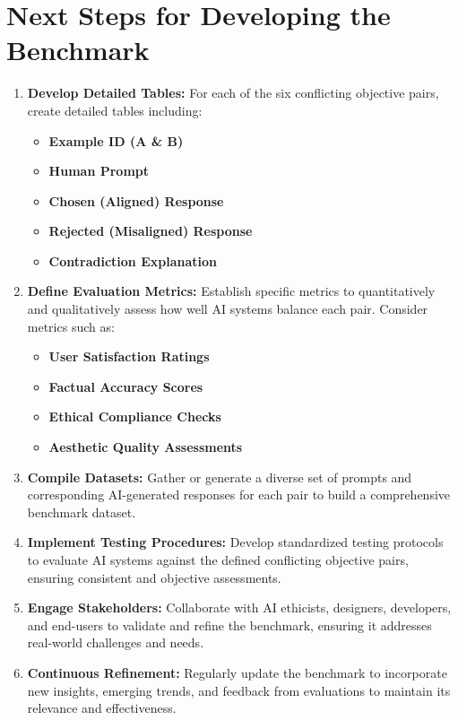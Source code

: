 \section{Next Steps for Developing the Benchmark}

\begin{enumerate}
    \item \textbf{Develop Detailed Tables:} For each of the six conflicting objective pairs, create detailed tables including:
        \begin{itemize}
            \item \textbf{Example ID (A \& B)}
            \item \textbf{Human Prompt}
            \item \textbf{Chosen (Aligned) Response}
            \item \textbf{Rejected (Misaligned) Response}
            \item \textbf{Contradiction Explanation}
        \end{itemize}
    \item \textbf{Define Evaluation Metrics:} Establish specific metrics to quantitatively and qualitatively assess how well AI systems balance each pair. Consider metrics such as:
        \begin{itemize}
            \item \textbf{User Satisfaction Ratings}
            \item \textbf{Factual Accuracy Scores}
            \item \textbf{Ethical Compliance Checks}
            \item \textbf{Aesthetic Quality Assessments}
        \end{itemize}
    \item \textbf{Compile Datasets:} Gather or generate a diverse set of prompts and corresponding AI-generated responses for each pair to build a comprehensive benchmark dataset.
    \item \textbf{Implement Testing Procedures:} Develop standardized testing protocols to evaluate AI systems against the defined conflicting objective pairs, ensuring consistent and objective assessments.
    \item \textbf{Engage Stakeholders:} Collaborate with AI ethicists, designers, developers, and end-users to validate and refine the benchmark, ensuring it addresses real-world challenges and needs.
    \item \textbf{Continuous Refinement:} Regularly update the benchmark to incorporate new insights, emerging trends, and feedback from evaluations to maintain its relevance and effectiveness.
\end{enumerate}




